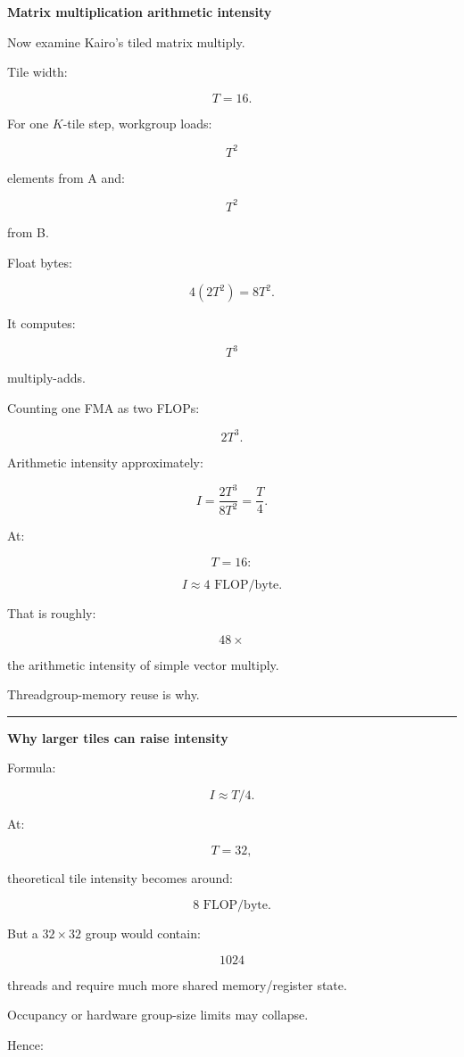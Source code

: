 \textbf{Matrix multiplication arithmetic intensity}

Now examine Kairo's tiled matrix multiply.

Tile width:

\[
T=16.
\]

For one \(K\)-tile step, workgroup loads:

\[
T^2
\]

elements from A and:

\[
T^2
\]

from B.

Float bytes:

\[
4(2T^2)
=
8T^2.
\]

It computes:

\[
T^3
\]

multiply-adds.

Counting one FMA as two FLOPs:

\[
2T^3.
\]

Arithmetic intensity approximately:

\[
\boxed{
I=
\frac{
2T^3
}{
8T^2
}
=
\frac T4.
}
\]

At:

\[
T=16:
\]

\[
\boxed{
I\approx4\text{ FLOP/byte}.
}
\]

That is roughly:

\[
48\times
\]

the arithmetic intensity of simple vector multiply.

Threadgroup-memory reuse is why.

\begin{center}\rule{0.5\linewidth}{0.5pt}\end{center}

\textbf{Why larger tiles can raise intensity}

Formula:

\[
I\approx T/4.
\]

At:

\[
T=32,
\]

theoretical tile intensity becomes around:

\[
8\text{ FLOP/byte}.
\]

But a \(32\times32\) group would contain:

\[
1024
\]

threads and require much more shared memory/register state.

Occupancy or hardware group-size limits may collapse.

Hence:

